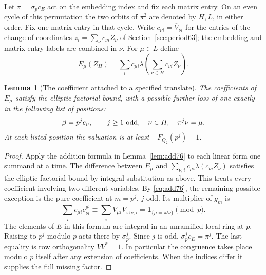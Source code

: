\documentclass[a4paper,11pt]{article}
\newtheorem{lemma}[proposition]{Lemma}
\theoremstyle{definition}
\theoremstyle{remark}
\numberwithin{equation}{section}
\begin{document}
Let \(\pi=\sigma_p c_E\) act on the embedding index and fix
each matrix entry. On an even cycle of this permutation the two
orbits of \(\pi^2\) are denoted by \(H,L\), in either order.
Fix one matrix entry in that cycle. Write \(c_{\nu i}=\overline
V_{\nu i}\) for the entries of the change of coordinates
\(z_i=\sum_\nu c_{\nu i}Z_\nu\) of Section~\ref{sec:period63};
the embedding and matrix-entry labels are combined in \(\nu\).
For \(\mu\in L\) define
\[
       E_\mu(Z_H)=\sum_i c_{\mu i}
                     \lambda\left(\sum_{\nu\in H}c_{\nu i} Z_\nu\right).
\]

\begin{lemma}[The coefficient attached to a specified translate]
\label{lem:partner76}
The coefficients of \(E_\mu\) satisfy the elliptic factorial
bound, with a possible further loss of one exactly in the
following list of positions:
\[
          \beta=p^j e_\nu,\qquad j\ge1\ {\rm odd},\quad
                       \nu\in H,\quad\pi^j\nu=\mu .
\]
At each listed position the valuation is at least
\(-F_{Q_2}(p^j)-1\).
\end{lemma}
\begin{proof}
Apply the addition formula in Lemma~\ref{lem:add76} to each
linear form one summand at a time. The difference between
\(E_\mu\) and \(\sum_{\nu,i} c_{\mu i}\lambda(c_{\nu i}Z_\nu)\)
satisfies the elliptic factorial bound by integral substitution
as above. This treats every coefficient involving two different
variables. By \eqref{eq:add76}, the remaining possible exception
is the pure coefficient at \(m=p^j\), \(j\) odd. Its multiplier
of \(g_m\) is
\[
            \sum_i c_{\mu i}c_{\nu i}^{p^j}
                 \equiv \sum_i\overline V_{\mu i} V_{\pi^j\nu,i}
                 =\mathbf1_{\{\mu=\pi^j\nu\}}\pmod{p}.
\]
The elements of \(E\) in this formula are integral in an
unramified local ring at \(p\). Raising to \(p^j\) modulo \(p\)
acts there by \(\sigma_p^j\). Since \(j\) is odd,
\(\sigma_p^j c_E=\pi^j\). The last equality is row
orthogonality \(VV^*=1\). In particular the congruence takes
place modulo \(p\) itself after any extension of coefficients.
When the indices differ it supplies the full missing factor.
\end{proof}
\end{document}
